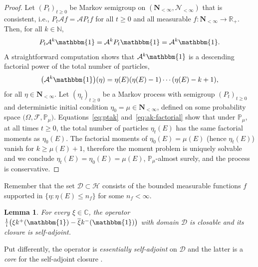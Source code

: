 \documentclass[10pt,a4paper]{amsart}
\numberwithin{equation}{section}
\newtheorem{Lemma}[Theorem]{Lemma}
\newcommand{\N}{\mathbb{N}}
\newcommand{\R}{\mathbb{R}}
\newcommand{\C}{\mathbb{C}}
\renewcommand{\P}{\mathbb{P}}
\newcommand{\one}{\mathbbm{1}}
\newcommand{\1}{\mathbbm{1}}
\begin{document}
\begin{proof}
	Let $(P_t)_{t\geq 0}$ be Markov semigroup on $(\mathbf N_{<\infty}, \mathcal N_{<\infty})$ that is consistent, i.e., $P_t \mathcal A f = \mathcal A P_t f$ for all $t\geq 0$ and all measurable $f\colon \mathbf N_{<\infty} \to \R_+$. Then, for all $k\in \N$,
	\begin{equation} \label{eq:ptak}
		P_t \mathcal A^k \one = \mathcal A^k P_t \one = \mathcal A^k \one.
	\end{equation}
	A straightforward computation shows that $\mathcal A^k\one$ is a descending factorial power of the total number of particles,
	\begin{equation} \label{eq:ak-factorial}
		\bigl( \mathcal A^k \one \bigr)(\eta) = \eta(E)( \eta(E)-1) \cdots ( \eta(E) - k +1),
	\end{equation}
	for all $\eta \in \mathbf N_{<\infty}$. Let $(\eta_t)_{t\geq 0}$ be a Markov process with semigroup $(P_t)_{t\geq 0}$ and deterministic initial condition $\eta_0=\mu \in \mathbf N_{<\infty}$, defined on some probability space $\bigl(\Omega,\mathscr F, \mathbb P_\mu\bigr)$. Equations~\eqref{eq:ptak} and~\eqref{eq:ak-factorial} show that under $\mathbb P_\mu$, at all times $t\geq 0$, the total number of particles $\eta_t(E)$ has the same factorial moments as $\eta_0(E)$. The factorial moments of $\eta_0(E) = \mu(E)$ (hence $\eta_t(E)$) vanish for $k\geq \mu(E)+1$, therefore the moment problem is uniquely solvable and we conclude $\eta_t(E) = \eta_0(E) = \mu(E)$, $\P_\mu$-almost surely, and the process is conservative.
\end{proof}

Remember that the set $\mathcal D\subset \mathcal H$ consists of the bounded measurable functions $f$ supported in $\{\eta\colon \eta(E)\leq n_f\}$ for some $n_f<\infty$.

\begin{Lemma} \label{lem:closure}
	For every $\xi \in \C$, the operator $\frac{1}{\mathrm i} \bigl( \xi k^+(\1) - \overline{\xi} k^-(\1)\bigr)$ with domain $\mathcal D$ is closable and its closure is self-adjoint.
\end{Lemma}

Put differently, the operator is \emph{essentially self-adjoint} on $\mathcal D$ and the latter is a \emph{core} for the self-adjoint closure \cite[Section VIII.2]{reedSimonI}.
\end{document}
